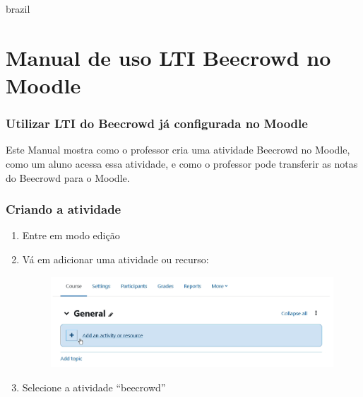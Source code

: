 \begin{otherlanguage*}{brazil}

\chapter{Manual de uso LTI Beecrowd no Moodle}

\subsection{Utilizar LTI do Beecrowd já configurada no Moodle}

Este Manual mostra como o professor cria uma atividade Beecrowd no Moodle, como um aluno acessa essa atividade, e como o professor pode transferir as notas do Beecrowd para o Moodle.

\subsection{Criando a atividade}

\begin{enumerate}
    \item Entre em modo edição
    \item Vá em adicionar uma atividade ou recurso:

    \begin{figure}[H]
        \centering
            \includegraphics[scale=0.425]{pictures/apendices/apendice_b_1.png}
    \end{figure}

    \item Selecione a atividade “beecrowd”


\end{enumerate}
\end{otherlanguage*}
